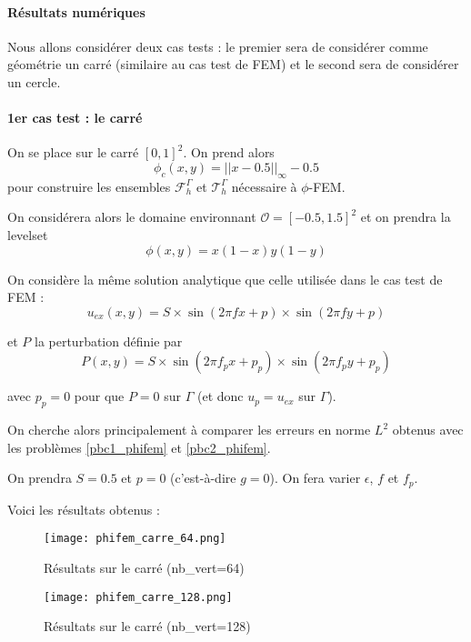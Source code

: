 \paragraph{Résultats numériques \\}

Nous allons considérer deux cas tests : le premier sera de considérer comme géométrie un carré (similaire au cas test de FEM) et le second sera de considérer un cercle.

\paragraph*{1er cas test : le carré \\}

On se place sur le carré $[0,1]^2$. On prend alors
$$\phi_c (x,y)=||x-0.5||_\infty-0.5$$
pour construire les ensembles $\mathcal{F}_h^\Gamma$ et $\mathcal{T}_h^\Gamma$ nécessaire à $\phi$-FEM.

On considérera alors le domaine environnant $\mathcal{O}=[-0.5,1.5]^2$ et on prendra la levelset
$$\phi (x,y)=x(1-x)y(1-y)$$

On considère la même solution analytique que celle utilisée dans le cas test de FEM :
$$u_{ex}(x,y) = S\times\sin(2\pi fx + p)\times\sin(2\pi fy + p)$$ 

et $P$ la perturbation définie par
$$P(x,y)=S\times\sin(2\pi f_px + p_p)\times\sin(2\pi f_py + p_p)$$

avec $p_p=0$ pour que $P=0$ sur $\Gamma$ (et donc $u_p=u_{ex}$ sur $\Gamma$). 

On cherche alors principalement à comparer les erreurs en norme $L^2$ obtenus avec les problèmes \ref{pbc1_phifem} et \ref{pbc2_phifem}.

On prendra $S=0.5$ et $p=0$ (c'est-à-dire $g=0$). On fera varier $\epsilon$, $f$ et $f_p$. 

Voici les résultats obtenus :

\begin{minipage}{0.48\linewidth}
	\begin{figure}[H]
		\centering
		\texttt{[image: phifem\_carre\_64.png]}
		\caption{Résultats sur le carré (nb\_vert=64)}
	\end{figure}
\end{minipage}
\begin{minipage}{0.48\linewidth}
	\begin{figure}[H]
		\centering
		\texttt{[image: phifem\_carre\_128.png]}
		\caption{Résultats sur le carré (nb\_vert=128)}
	\end{figure}
\end{minipage}

